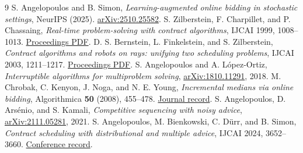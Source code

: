 \documentclass[11pt,a4paper]{amsart}
\begin{document}
\begin{thebibliography}{9}
S. Angelopoulos and B. Simon, \emph{Learning-augmented online bidding in stochastic settings}, NeurIPS (2025). \href{https://arxiv.org/abs/2510.25582}{arXiv:2510.25582}.
S. Zilberstein, F. Charpillet, and P. Chassaing, \emph{Real-time problem-solving with contract algorithms}, IJCAI 1999, 1008--1013. \href{https://ijcai.org/proceedings/1999/0144.pdf}{Proceedings PDF}.
D. S. Bernstein, L. Finkelstein, and S. Zilberstein, \emph{Contract algorithms and robots on rays: unifying two scheduling problems}, IJCAI 2003, 1211--1217. \href{https://ijcai.org/proceedings/2003/0172.pdf}{Proceedings PDF}.
S. Angelopoulos and A. L\'opez-Ortiz, \emph{Interruptible algorithms for multiproblem solving}, \href{https://arxiv.org/abs/1810.11291}{arXiv:1810.11291}, 2018.
M. Chrobak, C. Kenyon, J. Noga, and N. E. Young, \emph{Incremental medians via online bidding}, Algorithmica \textbf{50} (2008), 455--478. \href{https://doi.org/10.1007/s00453-007-9005-x}{Journal record}.
S. Angelopoulos, D. Ars\'enio, and S. Kamali, \emph{Competitive sequencing with noisy advice}, \href{https://arxiv.org/abs/2111.05281}{arXiv:2111.05281}, 2021.
S. Angelopoulos, M. Bienkowski, C. D\"urr, and B. Simon, \emph{Contract scheduling with distributional and multiple advice}, IJCAI 2024, 3652--3660. \href{https://doi.org/10.24963/ijcai.2024/404}{Conference record}.
\end{thebibliography}
\end{document}
